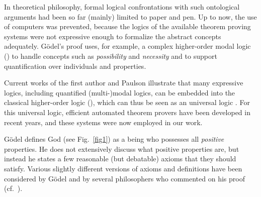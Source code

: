 \documentclass{ecai2014}
\newcommand\entity[1]{\text{\textrm{#1}}}
\def\HOML{\entity{HOML}\xspace}
\def\HOL{\entity{HOL}\xspace}
\begin{document}
In theoretical philosophy, formal logical confrontations with such
ontological arguments had been so far (mainly) limited to paper
and pen.  Up to now, the use of computers was prevented, because the
logics of the available theorem proving systems were not expressive
enough to formalize the abstract concepts adequately. G{\"o}del's proof
uses, for example, a complex higher-order modal logic (\HOML) to handle
concepts such as \emph{possibility} and \emph{necessity} and to support
quantification over individuals and properties.

Current works \cite{J23,B9} of the first author and Paulson illustrate that many
expressive logics, including quantified (multi-)modal logics, can be
embedded into the classical higher-order logic (\HOL), which can thus be seen
as an universal logic \cite{C36}. For this universal logic, efficient automated
theorem provers have been developed in recent years, and these systems
were now employed in our work.

G\"{o}del defines God (see Fig.~\ref{fig1}) as a being who possesses all \emph{positive}
properties.  He does not extensively discuss what positive properties
are, but instead he states a few reasonable (but debatable) axioms
that they should satisfy.  Various slightly different versions of
axioms and definitions have been considered by G\"{o}del and by
several philosophers who commented on his proof
(cf.~\cite{sobel2004logic,anderson90:_some_emend_of_goedel_ontol_proof,AndersonGettings,Fitting,Adams,ContemporaryBibliography}).
\end{document}

